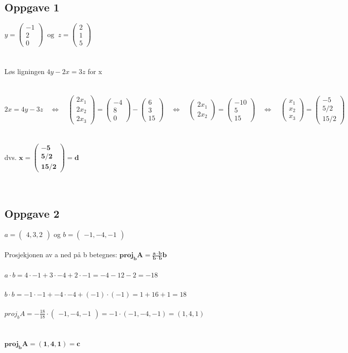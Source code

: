\documentclass{article}
\date{}
\newcommand{\vect}[1]{\begin{pmatrix} #1 \end{pmatrix}}
\newcommand{\eq}{\quad\Longleftrightarrow\quad}
\begin{document}
\subsection*{Oppgave 1}
\(y = \vect{-1\\2\\0}\ \text{ og } \ z=\vect{2\\1\\5} \)
\\\\\\
Løs ligningen \(4y-2x=3z\) for x
\\\\\\
\(2x = 4y-3z \eq \vect{2x_1\\2x_2\\2x_3} = \vect{-4\\8\\0} - \vect{6\\3\\15} \eq \vect{2x_1\\2x_2} = \vect{-10\\5\\15} \eq \vect{x_1\\x_2\\x_3} = \vect{-5\\ 5/2\\ 15/2}\)
\\\\\\
dvs. \(\mathbf{x = \vect{-5\\5/2\\15/2} = d}\)
\\\\\\


\subsection*{Oppgave 2}
\(a = \vect{4, 3, 2}\) og \(b = \vect{-1, -4, -1}\)
\\\\
Prosjekjonen av a ned på b betegnes: \quad \(\mathbf{proj_b A = \frac{a\cdot b}{b \cdot b}b}\)
\\\\
\(a\cdot b = 4\cdot-1 + 3\cdot-4 + 2\cdot-1 = -4-12-2=-18\)
\\\\
\(b\cdot b = -1\cdot-1 + -4\cdot-4 + (-1)\cdot(-1) = 1 + 16 + 1 = 18\)
\\\\
\(proj_bA = -\frac{18}{18}\cdot\vect{-1, -4, -1} = -1 \cdot (-1, -4, -1) = (1, 4, 1)\)
\\\\\\
\(\mathbf{proj_bA = (1, 4, 1) = c}\)
\\\\\\
\end{document}
